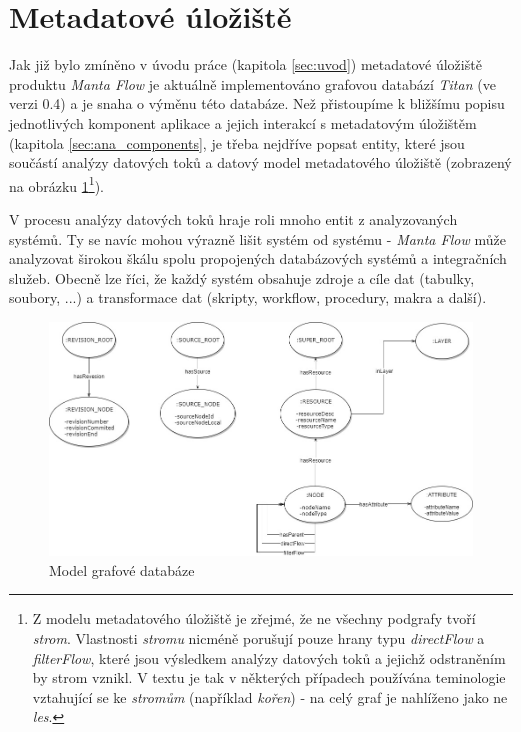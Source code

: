 \section{Metadatové úložiště}
\label{sec:ana_model}
Jak již bylo zmíněno v úvodu práce (kapitola \ref{sec:uvod}) metadatové úložiště produktu \textit{Manta Flow} je aktuálně implementováno grafovou databází \textit{Titan} (ve verzi 0.4) a je snaha o výměnu této databáze\cite{Kovar18}.
Než přistoupíme k bližšímu popisu jednotlivých komponent aplikace a jejich interakcí s metadatovým úložištěm (kapitola \ref{sec:ana_components}, je třeba nejdříve popsat entity, které jsou součástí analýzy datových toků a datový model metadatového úložiště (zobrazený na obrázku \ref{fig:ana-model}\footnote{Z modelu metadatového úložiště je zřejmé, že ne všechny podgrafy tvoří \textit{strom}. Vlastnosti \textit{stromu} nicméně porušují pouze hrany typu \textit{directFlow} a \textit{filterFlow}, které jsou výsledkem analýzy datových toků a jejichž odstraněním by strom vznikl. V textu je tak v některých případech používána teminologie vztahující se ke \textit{stromům} (například \textit{kořen}) - na celý graf je nahlíženo jako ne \textit{les}.}).

V procesu analýzy datových toků hraje roli mnoho entit z analyzovaných systémů. Ty se navíc mohou výrazně lišit systém od systému - \textit{Manta Flow} může analyzovat širokou škálu spolu propojených databázových systémů a integračních služeb. Obecně lze říci, že každý systém obsahuje zdroje a cíle dat (tabulky, soubory, ...) a transformace dat (skripty, \textit{} workflow, procedury, makra a další).

\begin{figure}
\begin{center}
\includegraphics[width=14cm]{figures/model}
\caption{Model grafové databáze}
\label{fig:ana-model}
\end{center}
\end{figure}


